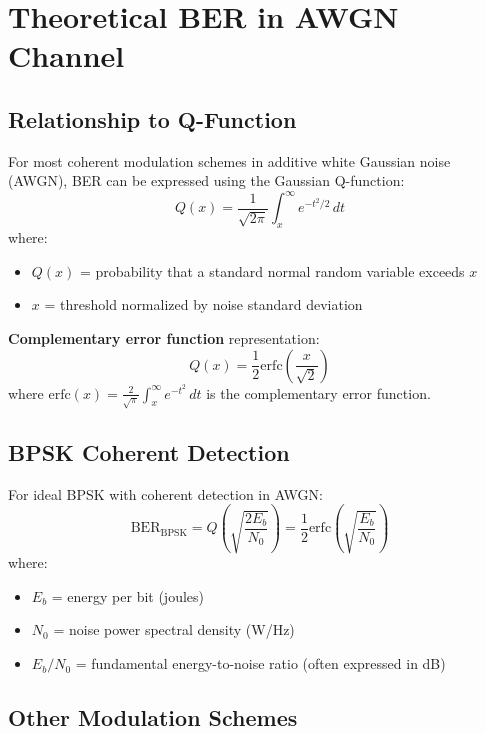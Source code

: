 \section{Theoretical BER in AWGN Channel}

\subsection{Relationship to Q-Function}

For most coherent modulation schemes in additive white Gaussian noise (AWGN), BER can be expressed using the Gaussian Q-function:
\begin{equation}
Q(x) = \frac{1}{\sqrt{2\pi}} \int_x^\infty e^{-t^2/2}\,dt
\label{eq:q-function}
\end{equation}
where:
\begin{itemize}
\item $Q(x)$ = probability that a standard normal random variable exceeds $x$
\item $x$ = threshold normalized by noise standard deviation
\end{itemize}

\textbf{Complementary error function} representation:
\begin{equation}
Q(x) = \frac{1}{2}\mathrm{erfc}\left(\frac{x}{\sqrt{2}}\right)
\label{eq:q-erfc}
\end{equation}
where $\mathrm{erfc}(x) = \frac{2}{\sqrt{\pi}}\int_x^\infty e^{-t^2}\,dt$ is the complementary error function.

\subsection{BPSK Coherent Detection}

For ideal BPSK with coherent detection in AWGN:
\begin{equation}
\mathrm{BER}_{\mathrm{BPSK}} = Q\left(\sqrt{\frac{2E_b}{N_0}}\right) = \frac{1}{2}\mathrm{erfc}\left(\sqrt{\frac{E_b}{N_0}}\right)
\label{eq:ber-bpsk}
\end{equation}
where:
\begin{itemize}
\item $E_b$ = energy per bit (joules)
\item $N_0$ = noise power spectral density (W/Hz)
\item $E_b/N_0$ = fundamental energy-to-noise ratio (often expressed in dB)
\end{itemize}

\subsection{Other Modulation Schemes}

